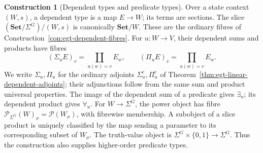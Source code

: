 \documentclass[11pt,a4paper]{article}
\numberwithin{equation}{section}
\theoremstyle{definition}
\newtheorem{construction}[construction]{Construction}
\theoremstyle{remark}
\theoremstyle{plain}
\begin{document}
\begin{construction}[Dependent types and predicate types]
\label{con:fib-dependent-types}
Over a state context $(W,s)$, a dependent type is a map $E\to W$;
its terms are sections. The slice
$(\mathbf{Set}/\Sigma^G)/(W,s)$ is canonically $\mathbf{Set}/W$.
These are the ordinary fibres of Construction~\ref{con:egt-dependent-fibres}.
For $u:W\to V$, their dependent sums and products have fibres
\[
 (\Sigma_uE)_v=\coprod_{u(w)=v}E_w,
 \qquad (\Pi_uE)_v=\prod_{u(w)=v}E_w.
\]
We write $\Sigma_u,\Pi_u$ for the ordinary adjoints
$\Sigma_u^{\mathrm c},\Pi_u^{\mathrm c}$ of
Theorem~\ref{thm:egt-linear-dependent-adjoints}; their adjunctions follow
from the same sum and product universal properties. The image of the dependent sum of a predicate gives
$\exists_u$; its dependent product gives $\forall_u$.
For $W\to\Sigma^G$, the power object has fibre
$\mathcal P_{\Sigma^G}(W)_\sigma=\mathcal P(W_\sigma)$, with fibrewise
membership. A subobject of a slice product is uniquely classified by
the map sending a parameter to its corresponding subset of $W_\sigma$.
The truth-value object is $\Sigma^G\times\{0,1\}\to\Sigma^G$.
Thus the construction also supplies higher-order predicate types.
\end{construction}
\end{document}
